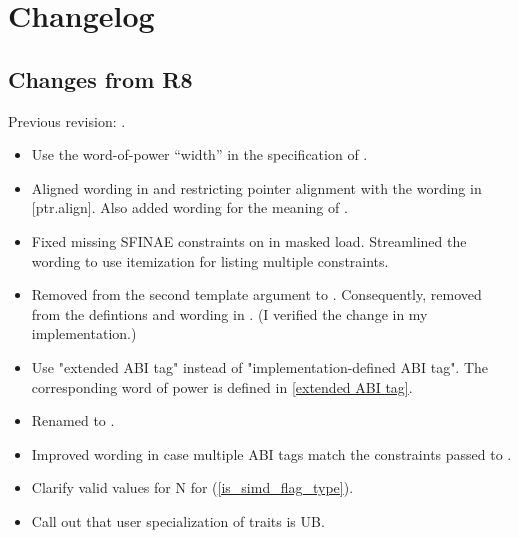 \section{Changelog}
\subsection{Changes from R8}
Previous revision: \parencite{P0214R8}.
\begin{itemize}
  \item Use the word-of-power “width” in the specification of .

  \item Aligned wording in  and  restricting pointer alignment with the wording in [ptr.align].
    Also added wording for the meaning of .

  \item Fixed missing SFINAE constraints on  in masked load.
    Streamlined the wording to use itemization for listing multiple constraints.

  \item Removed  from the second template argument to .
    Consequently, removed  from the defintions and wording in .
    (I verified the change in my implementation.)

  \item Use "extended ABI tag" instead of "implementation-defined ABI tag". The corresponding word of power is defined in \ref{extended ABI tag}.

  \item Renamed  to .

  \item Improved wording in case multiple ABI tags match the constraints passed to .

  \item Clarify valid values for \code N for  (\ref{is_simd_flag_type}).

  \item Call out that user specialization of traits is UB.
\end{itemize}

